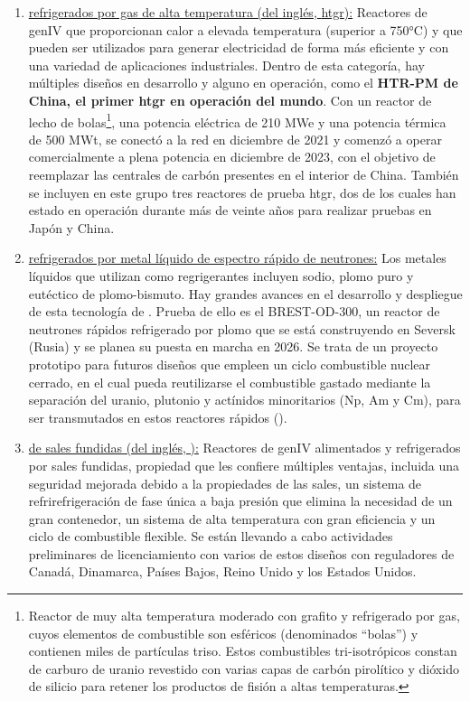 \begin{enumerate}
\item \underline{ refrigerados por gas de alta temperatura (del inglés, \acrshort{htgr}):} Reactores de \acrshort{genIV} que proporcionan calor a elevada temperatura (superior a 750°C) y que pueden ser utilizados para generar electricidad de forma más eficiente y con una variedad de aplicaciones industriales. Dentro de esta categoría, hay múltiples diseños en desarrollo y alguno en operación, como el \textbf{HTR-PM de China, el primer \acrshort{htgr} en operación del mundo}. Con un reactor de lecho de bolas\footnote{Reactor de muy alta temperatura moderado con grafito y refrigerado por gas, cuyos elementos de combustible son esféricos (denominados ``bolas'') y contienen miles de partículas \acrshort{triso}. Estos combustibles tri-isotrópicos constan de carburo de uranio revestido con varias capas de carbón pirolítico y dióxido de silicio para retener los productos de fisión a altas temperaturas.}, una potencia eléctrica de 210 MWe y una potencia térmica de 500 MWt, se conectó a la red en diciembre de 2021 y comenzó a operar comercialmente a plena potencia en diciembre de 2023, con el objetivo de reemplazar las centrales de carbón presentes en el interior de China. También se incluyen en este grupo tres reactores de prueba \acrshort{htgr}, dos de los cuales han estado en operación durante más de veinte años para realizar pruebas en Japón y China.

\item \underline{ refrigerados por metal líquido de espectro rápido de neutrones:} Los metales líquidos que utilizan como regrigerantes incluyen sodio, plomo puro y eutéctico de plomo-bismuto. Hay grandes avances en el desarrollo y despliegue de esta tecnología de . Prueba de ello es el BREST-OD-300, un reactor de neutrones rápidos refrigerado por plomo que se está construyendo en Seversk (Rusia) y se planea su puesta en marcha en 2026. Se trata de un proyecto prototipo para futuros diseños que empleen un ciclo combustible nuclear cerrado, en el cual pueda reutilizarse el combustible gastado mediante la separación del uranio, plutonio y actínidos minoritarios (Np, Am y Cm), para ser transmutados en estos reactores rápidos (\cite{apuntes_centrales}).

\item \underline{ de sales fundidas (del inglés, ):} Reactores de \acrshort{genIV} alimentados y refrigerados por sales fundidas, propiedad que les confiere múltiples ventajas, incluida una seguridad mejorada debido a la propiedades de las sales, un sistema de refrirefrigeración de fase única a baja presión que elimina la necesidad de un gran contenedor, un sistema de alta temperatura con gran eficiencia y un ciclo de combustible flexible. Se están llevando a cabo actividades preliminares de licenciamiento con varios de estos diseños con reguladores de Canadá, Dinamarca, Países Bajos, Reino Unido y los Estados Unidos.


\end{enumerate}
